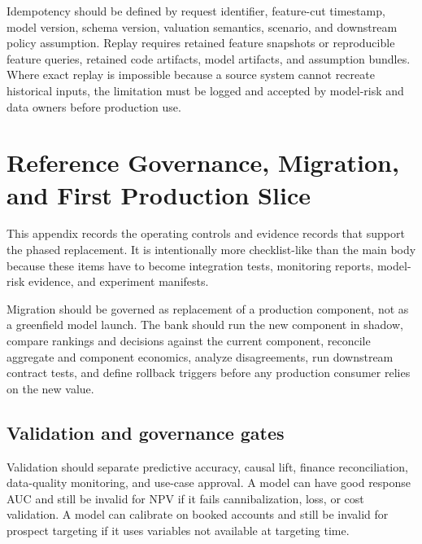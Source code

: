 \documentclass[11pt]{article}
\newcommand{\1}{\mathbf{1}}
\begin{document}
Idempotency should be defined by request identifier, feature-cut timestamp,
model version, schema version, valuation semantics, scenario, and downstream
policy assumption. Replay requires retained feature snapshots or reproducible
feature queries, retained code artifacts, model artifacts, and assumption
bundles. Where exact replay is impossible because a source system cannot
recreate historical inputs, the limitation must be logged and accepted by
model-risk and data owners before production use.

\section{Reference Governance, Migration, and First Production Slice}
\label{sec:governance-migration}

This appendix records the operating controls and evidence records that support
the phased replacement. It is intentionally more checklist-like than the main
body because these items have to become integration tests, monitoring reports,
model-risk evidence, and experiment manifests.

Migration should be governed as replacement of a production component, not as a
greenfield model launch. The bank should run the new component in shadow,
compare rankings and decisions against the current component, reconcile
aggregate and component economics, analyze disagreements, run downstream
contract tests, and define rollback triggers before any production consumer
relies on the new value.

\subsection{Validation and governance gates}
\label{subsec:validation-governance-gates}

Validation should separate predictive accuracy, causal lift, finance
reconciliation, data-quality monitoring, and use-case approval. A model can
have good response AUC and still be invalid for NPV if it fails
cannibalization, loss, or cost validation. A model can calibrate on booked
accounts and still be invalid for prospect targeting if it uses variables not
available at targeting time.
\end{document}
